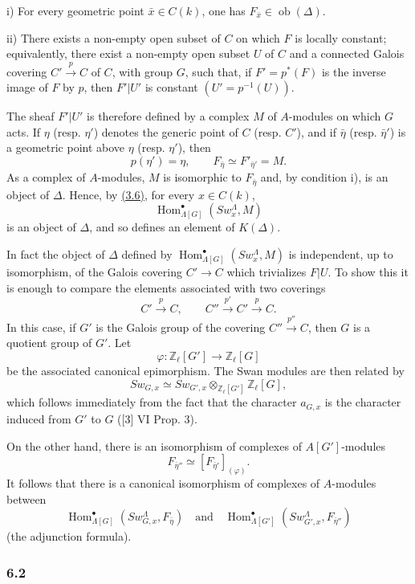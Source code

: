 \documentclass[11pt]{article}
\DeclareMathOperator{\Hom}{Hom}
\providecommand{\Ob}{\operatorname{ob}}
\providecommand{\Hom}{\operatorname{Hom}}
\providecommand{\Ob}{\operatorname{ob}}
\providecommand{\Ob}{\operatorname{Ob}}
\providecommand{\Hom}{\operatorname{Hom}}
\providecommand{\Ob}{\operatorname{ob}}
\providecommand{\Ob}{\operatorname{Ob}}
\begin{document}
i) For every geometric point $\bar x\in C(k)$, one has $F_{\bar x}\in\Ob(\Delta)$.

ii) There exists a non-empty open subset of $C$ on which $F$ is locally constant; equivalently, there exist a non-empty open subset $U$ of $C$ and a connected Galois covering $C'\xrightarrow{p}C$ of $C$, with group $G$, such that, if $F'=p^*(F)$ is the inverse image of $F$ by $p$, then $F'|U'$ is constant $(U'=p^{-1}(U))$.

The sheaf $F'|U'$ is therefore defined by a complex $M$ of $A$-modules on which $G$ acts. If $\eta$ (resp. $\eta'$) denotes the generic point of $C$ (resp. $C'$), and if $\bar\eta$ (resp. $\bar\eta'$) is a geometric point above $\eta$ (resp. $\eta'$), then
\[
p(\eta')=\eta,\qquad
F_{\bar\eta}\simeq F'_{\bar\eta'}=M.
\tag{6.1.1}\label{sga5:X:equation:6.1.1}
\]
As a complex of $A$-modules, $M$ is isomorphic to $F_{\bar\eta}$ and, by condition i), is an object of $\Delta$. Hence, by \hyperref[sga5:X:proposition:3.6]{(3.6)}, for every $x\in C(k)$,
\[
\Hom^\bullet_{\Lambda[G]}(Sw_x^\Lambda,M)
\]
is an object of $\Delta$, and so defines an element of $K(\Delta)$.

In fact the object of $\Delta$ defined by $\Hom^\bullet_{\Lambda[G]}(Sw_x^\Lambda,M)$ is independent, up to isomorphism, of the Galois covering $C'\to C$ which trivializes $F|U$. To show this it is enough to compare the elements associated with two coverings
\[
C'\xrightarrow{p}C,\qquad C''\xrightarrow{p'}C'\xrightarrow{p}C.
\]
In this case, if $G'$ is the Galois group of the covering $C''\xrightarrow{p''}C$, then $G$ is a quotient group of $G'$. Let
\[
\varphi:\mathbb Z_\ell[G']\longrightarrow \mathbb Z_\ell[G]
\]
be the associated canonical epimorphism. The Swan modules are then related by
\[
Sw_{G,x}\simeq Sw_{G',x}\otimes_{\mathbb Z_\ell[G']}\mathbb Z_\ell[G],
\]
which follows immediately from the fact that the character $a_{G,x}$ is the character induced from $G'$ to $G$ ([3] VI Prop. 3).

On the other hand, there is an isomorphism of complexes of $A[G']$-modules
\[
F_{\bar\eta''}\simeq [F_{\bar\eta'}]_{(\varphi)}.
\]
It follows that there is a canonical isomorphism of complexes of $A$-modules between
\[
\Hom^\bullet_{\Lambda[G]}(Sw_{G,x}^\Lambda,F_{\bar\eta})
\quad\text{and}\quad
\Hom^\bullet_{\Lambda[G']}(Sw_{G',x}^\Lambda,F_{\bar\eta''})
\]
(the adjunction formula).

\subsubsection*{6.2}\label{sga5:X:subsubsection:6.2}
\end{document}
